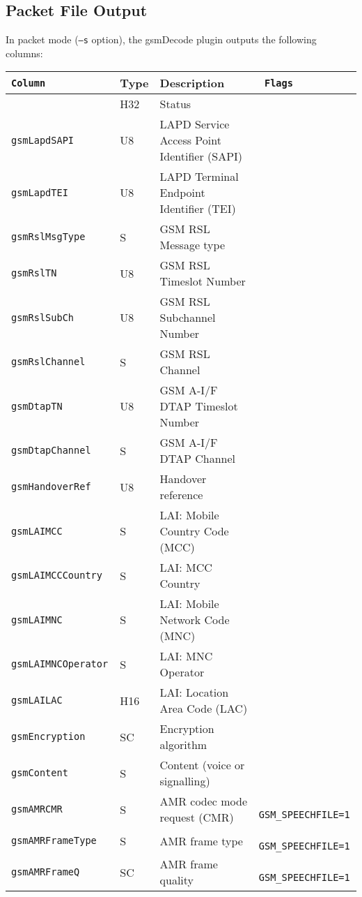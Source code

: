 \documentclass[documentation]{subfiles}
\begin{document}
\subsection{Packet File Output}
In packet mode ({\tt --s} option), the gsmDecode plugin outputs the following columns:
\begin{longtable}{>{\tt}lll>{\tt\small}l}
    \toprule
    {\bf Column} & {\bf Type} & {\bf Description} & {\bf Flags}\\
    \midrule\endhead%
    \nameref{gsmStat} & H32   & Status                                      & \\
    gsmLapdSAPI       & U8    & LAPD Service Access Point Identifier (SAPI) & \\
    gsmLapdTEI        & U8    & LAPD Terminal Endpoint Identifier (TEI)     & \\
    gsmRslMsgType     & S     & GSM RSL Message type                        & \\
    gsmRslTN          & U8    & GSM RSL Timeslot Number                     & \\
    gsmRslSubCh       & U8    & GSM RSL Subchannel Number                   & \\
    gsmRslChannel     & S     & GSM RSL Channel                             & \\
    gsmDtapTN         & U8    & GSM A-I/F DTAP Timeslot Number              & \\
    gsmDtapChannel    & S     & GSM A-I/F DTAP Channel                      & \\
    gsmHandoverRef    & U8    & Handover reference                          & \\
    gsmLAIMCC         & S     & LAI: Mobile Country Code (MCC)              & \\
    gsmLAIMCCCountry  & S     & LAI: MCC Country                            & \\
    gsmLAIMNC         & S     & LAI: Mobile Network Code (MNC)              & \\
    gsmLAIMNCOperator & S     & LAI: MNC Operator                           & \\
    gsmLAILAC         & H16   & LAI: Location Area Code (LAC)               & \\
    gsmEncryption     & SC    & Encryption algorithm                        & \\
    gsmContent        & S     & Content (voice or signalling)               & \\
    gsmAMRCMR         & S     & AMR codec mode request (CMR)                & GSM\_SPEECHFILE=1\\
    gsmAMRFrameType   & S     & AMR frame type                              & GSM\_SPEECHFILE=1\\
    gsmAMRFrameQ      & SC    & AMR frame quality                           & GSM\_SPEECHFILE=1\\
    \bottomrule
\end{longtable}
\end{document}
